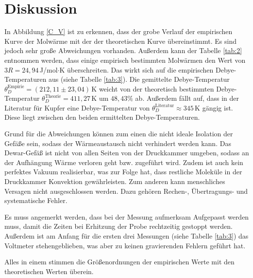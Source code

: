 \section{Diskussion}
In Abbildung \ref{C_V} ist zu erkennen,
dass der grobe Verlauf der empirischen Kurve der Molwärme
mit der der theoretischen Kurve übereinstimmt.
Es sind jedoch sehr große Abweichungen vorhanden.
Außerdem kann der Tabelle \ref{tab:2} entnommen werden,
dass einige empirisch bestimmten Molwärmen den Wert von $3R = 24,94$\,J/mol$\cdot$K überschreiten.
Das wirkt sich auf die empirischen Debye-Temperaturen aus (siehe Tabelle \ref{tab:3}).
Die gemittelte Debye-Temperatur $\theta_D^{\text{Empirie}} = (212,11\pm23,04)$\,K
weicht von der theoretisch bestimmten Debye-Temperatur $\theta_D^{\text{Theorie}} = 411,27$\,K
um $48,43\%$ ab.
Außerdem fällt auf, dass in der Literatur für Kupfer eine Debye-Temperatur von $\theta_D^{\text{Literatur}} \approx 345$\,K \cite{debye} gängig ist.
Diese liegt zwischen den beiden ermittelten Debye-Temperaturen.

Grund für die Abweichungen können zum einen die nicht ideale Isolation der Gefäße sein,
sodass der Wärmeaustausch nicht verhindert werden kann.
Das Dewar-Gefäß ist nicht von allen Seiten von der Druckkammer umgeben, sodass an der Aufhängung
Wärme verloren geht bzw. zugeführt wird.
Zudem ist auch kein perfektes Vakuum realisierbar, was zur Folge hat, dass restliche Moleküle in der Druckkammer Konvektion gewährleisten.
Zum anderen kann menschliches Versagen nicht ausgeschlossen werden.
Dazu gehören Rechen-, Übertragungs- und systematische Fehler.

Es muss angemerkt werden, dass bei der Messung aufmerksam Aufgepasst werden muss, damit die Zeiten bei Erhitzung der Probe rechtzeitig gestoppt werden.
Außerdem ist am Anfang für die ersten drei Messungen (siehe Tabelle \ref{tab:3}) das Voltmeter stehengeblieben, was aber zu keinen gravierenden Fehlern geführt hat.

Alles in einem stimmen die Größenordnungen der empirischen Werte mit den theoretischen Werten überein.
